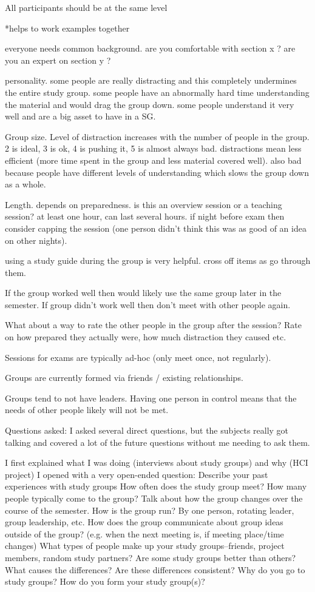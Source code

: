 \documentclass[conference]{IEEEtran}
\begin{document}
All participants should be at the same level

*helps to work examples together

everyone needs common background.
  are you comfortable with section x ?
  are you an expert on section y ?

personality.
  some people are really distracting and this completely undermines the entire study group.
  some people have an abnormally hard time understanding the material and would drag the group down.
  some people understand it very well and are a big asset to have in a SG.

Group size.
  Level of distraction increases with the number of people in the group.
  2 is ideal, 3 is ok, 4 is pushing it, 5 is almost always bad.
  distractions mean less efficient (more time spent in the group and less material covered well).
  also bad because people have different levels of understanding which slows the group down as a whole.

Length.
  depends on preparedness.
    is this an overview session or a teaching session?
  at least one hour, can last several hours.
      if night before exam then consider capping the session (one person didn't think this was as good of an idea on other nights).

using a study guide during the group is very helpful.
  cross off items as go through them.

If the group worked well then would likely use the same group later in the semester.
If group didn't work well then don't meet with other people again.

What about a way to rate the other people in the group after the session?  
Rate on how prepared they actually were, how much distraction they caused etc.

Sessions for exams are typically ad-hoc (only meet once, not regularly).

Groups are currently formed via friends / existing relationships.

Groups tend to not have leaders.  
Having one person in control means that the needs of other people likely will not be met.

Questions asked:
I asked several direct questions, but the subjects really got talking and covered a lot of the future questions without me needing to ask them.

I first explained what I was doing (interviews about study groups) and why (HCI project)
I opened with a very open-ended question:  Describe your past experiences with study groups
How often does the study group meet?
How many people typically come to the group?
Talk about how the group changes over the course of the semester.
How is the group run?  By one person, rotating leader, group leadership, etc.
How does the group communicate about group ideas outside of the group? (e.g. when the next meeting is, if meeting place/time changes)
What types of people make up your study groups--friends, project members, random study partners?
Are some study groups better than others?  What causes the differences?  Are these differences consistent?
Why do you go to study groups?
How do you form your study group(s)?




\end{document}
